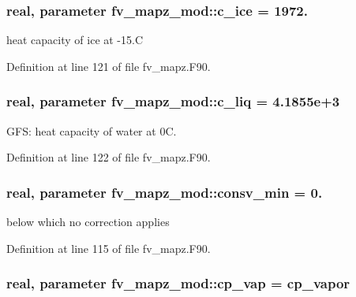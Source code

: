 \subsubsection[{c\-\_\-ice}]{\setlength{\rightskip}{0pt plus 5cm}real, parameter fv\-\_\-mapz\-\_\-mod\-::c\-\_\-ice = 1972.}\label{classfv__mapz__mod_aaa58d5b9a96c7678b42b9f21dae04d56}


heat capacity of ice at -\/15.\-C 



Definition at line 121 of file fv\-\_\-mapz.\-F90.

\subsubsection[{c\-\_\-liq}]{\setlength{\rightskip}{0pt plus 5cm}real, parameter fv\-\_\-mapz\-\_\-mod\-::c\-\_\-liq = 4.\-1855e+3}\label{classfv__mapz__mod_aa0e5a6070f8657332c3dc64bd06f62bc}


G\-F\-S\-: heat capacity of water at 0\-C. 



Definition at line 122 of file fv\-\_\-mapz.\-F90.

\subsubsection[{consv\-\_\-min}]{\setlength{\rightskip}{0pt plus 5cm}real, parameter fv\-\_\-mapz\-\_\-mod\-::consv\-\_\-min = 0.}\label{classfv__mapz__mod_a7879730f4b2baa275cd6abaf9c369bb5}


below which no correction applies 



Definition at line 115 of file fv\-\_\-mapz.\-F90.

\subsubsection[{cp\-\_\-vap}]{\setlength{\rightskip}{0pt plus 5cm}real, parameter fv\-\_\-mapz\-\_\-mod\-::cp\-\_\-vap = cp\-\_\-vapor}\label{classfv__mapz__mod_aefa9aa99fd17c4042bf8dab0df746acc}


